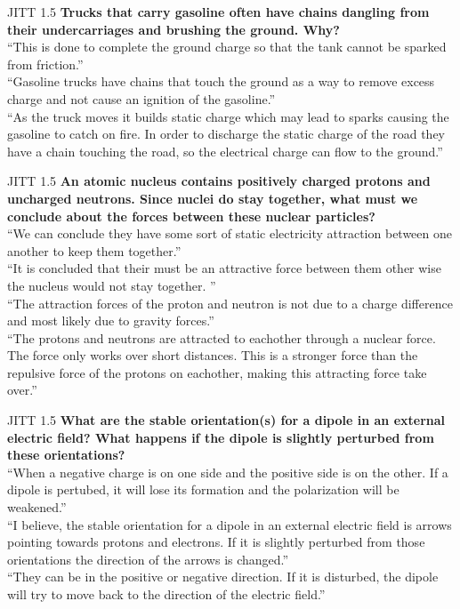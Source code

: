 \documentclass{beamer}
\begin{document}
\begin{frame}{JITT 1.5}
\textbf{Trucks that carry gasoline often have chains dangling from their undercarriages and brushing the ground. Why?} \\
``This is done to complete the ground charge so that the tank cannot be sparked from friction.'' \\
``Gasoline trucks have chains that touch the ground as a way to remove excess charge and not cause an ignition of the gasoline.'' \\
``As the truck moves it builds static charge which may lead to sparks causing the gasoline to catch on fire. In order to discharge the static charge of the road they have a chain touching the road, so the electrical charge can flow to the ground.''
\end{frame}

\begin{frame}{JITT 1.5}
\small
\textbf{An atomic nucleus contains positively charged protons and uncharged neutrons. Since nuclei do stay together, what must we conclude about the forces between these nuclear particles?} \\
``We can conclude they have some sort of static electricity attraction between one another to keep them together.'' \\
``It is concluded that their must be an attractive force between them other wise the nucleus would not stay together. '' \\
``The attraction forces of the proton and neutron is not due to a charge difference and most likely due to gravity forces.'' \\
``The protons and neutrons are attracted to eachother through a nuclear force. The force only works over short distances. This is a stronger force than the repulsive force of the protons on eachother, making this attracting force take over.'' 
\end{frame}

\begin{frame}{JITT 1.5}
\textbf{What are the stable orientation(s) for a dipole in an external electric field? What happens if the dipole is slightly perturbed from these orientations?} \\
``When a negative charge is on one side and the positive side is on the other. If a dipole is pertubed, it will lose its formation and the polarization will be weakened.'' \\ 
``I believe, the stable orientation for a dipole in an external electric field is arrows pointing towards protons and electrons. If it is slightly perturbed from those orientations the direction of the arrows is changed.'' \\
``They can be in the positive or negative direction. If it is disturbed, the dipole will try to move back to the direction of the electric field.''
\end{frame}
\end{document}
